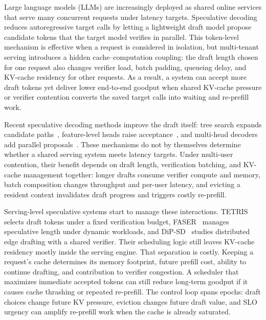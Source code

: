 \documentclass[journal]{IEEEtran}
\begin{document}
Large language models (LLMs) are increasingly deployed as shared online
services that serve many concurrent requests under latency targets.
Speculative decoding~\cite{leviathan2023fast, chen2023accelerating}
reduces autoregressive target calls by letting a lightweight draft model
propose candidate tokens that the target model verifies in parallel.
This token-level mechanism is effective when a request is considered in
isolation, but multi-tenant serving introduces a hidden
cache--computation coupling: the draft length chosen for one request
also changes verifier load, batch padding, queueing delay, and
KV-cache residency for other requests. As a result, a system can accept
more draft tokens yet deliver lower end-to-end goodput when shared
KV-cache pressure or verifier contention converts the saved target
calls into waiting and re-prefill work.

Recent speculative decoding methods improve the draft itself: tree
search expands candidate paths~\cite{miao2024specinfer}, feature-level
heads raise acceptance~\cite{li2024eagle, li2024eagle2}, and multi-head
decoders add parallel proposals~\cite{cai2024medusa}. These mechanisms
do not by themselves determine whether a shared serving system meets
latency targets. Under multi-user contention, their benefit depends on
draft length, verification batching, and KV-cache management together:
longer drafts consume verifier compute and memory, batch composition
changes throughput and per-user latency, and evicting a resident
context invalidates draft progress and triggers costly re-prefill.

Serving-level speculative systems start to manage these interactions.
TETRIS~\cite{wu2025tetris} selects draft tokens under a fixed
verification budget, FASER~\cite{chen2026faser} manages speculative
length under dynamic workloads, and DiP-SD~\cite{xu2026dipsd} studies
distributed edge drafting with a shared verifier. Their scheduling
logic still leaves KV-cache residency mostly inside the serving engine.
That separation is costly. Keeping a request's cache determines its
memory footprint, future prefill cost, ability to continue drafting,
and contribution to verifier congestion. A scheduler that maximizes
immediate accepted tokens can still reduce long-term goodput if it
causes cache thrashing or repeated re-prefill. The control loop spans
epochs: draft choices change future KV pressure, eviction changes
future draft value, and SLO urgency can amplify re-prefill work when
the cache is already saturated.
\end{document}
